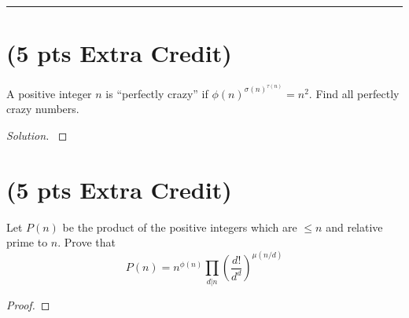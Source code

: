 \documentclass[11pt]{article}
\newenvironment{myproblem}[1][Problem]{\begin{trivlist}
    \item[\hskip \labelsep {\bfseries #1.}]}{\end{trivlist}}
\newenvironment{solution}
  {\renewcommand\qedsymbol{$~$}\begin{proof}[Solution]$ $\par\nobreak\ignorespaces}
  {\end{proof}}
\begin{document}
\hrule

\section{(5 pts Extra Credit)}

\begin{myproblem}
  A positive integer $n$ is ``perfectly crazy'' if $\phi(n)^{\sigma(n)^{\tau(n)}} = n^2$. Find all perfectly crazy numbers.
\end{myproblem}

\begin{solution}

\end{solution}


\section{(5 pts Extra Credit)}

\begin{myproblem}
  Let $P(n)$ be the product of the positive integers which are $\leq n$ and relative prime to $n$. Prove that
  \[
    P(n) = n^{\phi(n)} \prod_{d|n} \left(\frac{d!}{d^d}\right)^{\mu(n/d)}
  \]
\end{myproblem}

\begin{proof}

\end{proof}
\end{document}
